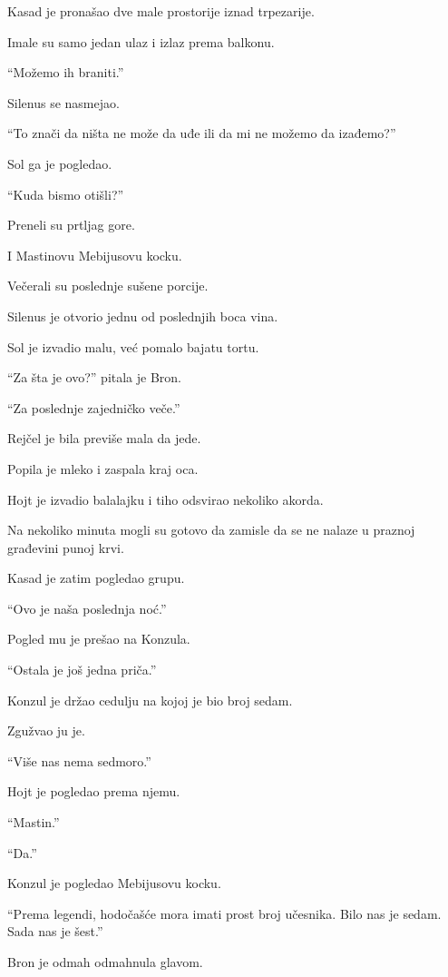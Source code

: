 \bigskip

Kasad je pronašao dve male prostorije iznad trpezarije.

Imale su samo jedan ulaz i izlaz prema balkonu.

``Možemo ih braniti.''

Silenus se nasmejao.

``To znači da ništa ne može da uđe ili da mi ne možemo da izađemo?''

Sol ga je pogledao.

``Kuda bismo otišli?''

Preneli su prtljag gore.

I Mastinovu Mebijusovu kocku.

\bigskip

Večerali su poslednje sušene porcije.

Silenus je otvorio jednu od poslednjih boca vina.

Sol je izvadio malu, već pomalo bajatu tortu.

``Za šta je ovo?'' pitala je Bron.

``Za poslednje zajedničko veče.''

Rejčel je bila previše mala da jede.

Popila je mleko i zaspala kraj oca.

Hojt je izvadio balalajku i tiho odsvirao nekoliko akorda.

Na nekoliko minuta mogli su gotovo da zamisle da se ne nalaze u praznoj građevini punoj krvi.

\bigskip

Kasad je zatim pogledao grupu.

``Ovo je naša poslednja noć.''

Pogled mu je prešao na Konzula.

``Ostala je još jedna priča.''

Konzul je držao cedulju na kojoj je bio broj sedam.

Zgužvao ju je.

``Više nas nema sedmoro.''

Hojt je pogledao prema njemu.

``Mastin.''

``Da.''

Konzul je pogledao Mebijusovu kocku.

``Prema legendi, hodočašće mora imati prost broj učesnika. Bilo nas je sedam. Sada nas je šest.''

Bron je odmah odmahnula glavom.

